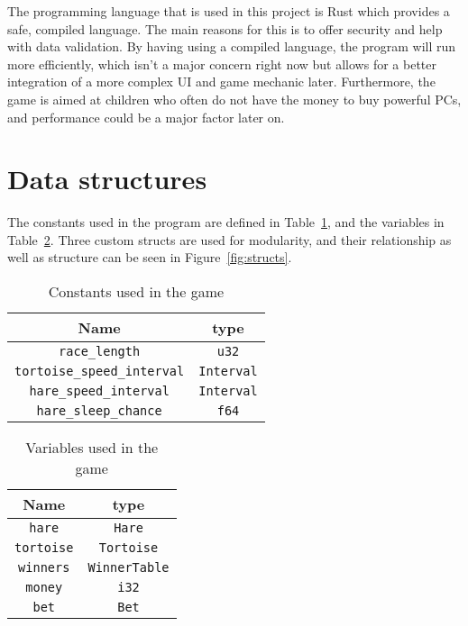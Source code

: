 \documentclass[11pt]{article}
\begin{document}
    The programming language that is used in this project is Rust \cite{rust} which provides a
    safe, compiled language. The main reasons for this is to offer security and help with data
    validation. By having using a compiled language, the program will run more efficiently, which
    isn't a major concern right now but allows for a better integration of a more complex UI and
    game mechanic later. Furthermore, the game is aimed at children who often do not have the money
    to buy powerful PCs, and performance could be a major factor later on.

    \section{Data structures}
    The constants used in the program are defined in Table~\ref{tab:consts}, and the variables
    in Table~\ref{tab:vars}. Three custom structs are used for modularity, and their relationship as
    well as structure can be seen in Figure~\ref{fig:structs}.

    \begin{table}[!ht]
        \centering
        \begin{tabular}{ | c c | }
            \hline
            Name & type \\
            \hline
            \texttt{race\_length} & \texttt{u32} \\
            \texttt{tortoise\_speed\_interval} & \texttt{Interval} \\
            \texttt{hare\_speed\_interval} & \texttt{Interval} \\
            \texttt{hare\_sleep\_chance} & \texttt{f64} \\
            \hline
        \end{tabular}
        \caption{Constants used in the game}%
        \label{tab:consts}
    \end{table}
    \begin{table}[!ht]
        \centering
        \begin{tabular}{ | c c | }
            \hline
            Name & type \\
            \hline
            \texttt{hare} & \texttt{Hare} \\
            \texttt{tortoise} & \texttt{Tortoise} \\
            \texttt{winners} & \texttt{WinnerTable} \\
            \texttt{money} & \texttt{i32} \\
            \texttt{bet} & \texttt{Bet} \\
            \hline
        \end{tabular}
        \caption{Variables used in the game}
        \label{tab:vars}
    \end{table}
\end{document}

